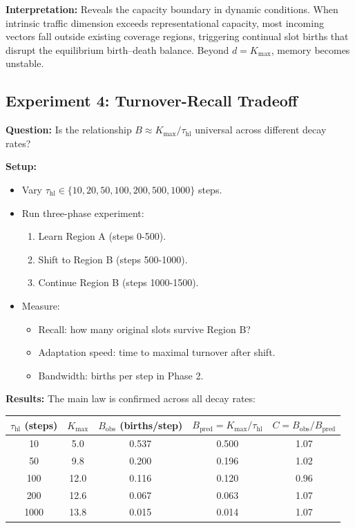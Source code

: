 \documentclass[11pt]{article}
\begin{document}
\textbf{Interpretation:}
Reveals the capacity boundary in dynamic conditions.
When intrinsic traffic dimension exceeds representational capacity, most incoming vectors fall outside existing coverage regions, triggering continual slot births that disrupt the equilibrium birth--death balance.
Beyond $d = K_{\max}$, memory becomes unstable.

\subsection{Experiment 4: Turnover-Recall Tradeoff}

\textbf{Question:} Is the relationship $B \approx K_{\max} / \tau_{\text{hl}}$ universal across different decay rates?

\textbf{Setup:}
\begin{itemize}
  \item Vary $\tau_{\text{hl}} \in \{10, 20, 50, 100, 200, 500, 1000\}$ steps.
  \item Run three-phase experiment:
    \begin{enumerate}
      \item Learn Region A (steps 0-500).
      \item Shift to Region B (steps 500-1000).
      \item Continue Region B (steps 1000-1500).
    \end{enumerate}
  \item Measure:
    \begin{itemize}
      \item Recall: how many original slots survive Region B?
      \item Adaptation speed: time to maximal turnover after shift.
      \item Bandwidth: births per step in Phase 2.
    \end{itemize}
\end{itemize}

\textbf{Results:}
The main law is confirmed across all decay rates:
\begin{center}
\begin{tabular}{ccccc}
\toprule
$\tau_{\text{hl}}$ (steps) & $K_{\max}$ & $B_{\text{obs}}$ (births/step) & $B_{\text{pred}} = K_{\max}/\tau_{\text{hl}}$ & $C = B_{\text{obs}}/B_{\text{pred}}$ \\
\midrule
10   &  5.0 & 0.537 & 0.500 & 1.07 \\
50   &  9.8 & 0.200 & 0.196 & 1.02 \\
100  & 12.0 & 0.116 & 0.120 & 0.96 \\
200  & 12.6 & 0.067 & 0.063 & 1.07 \\
1000 & 13.8 & 0.015 & 0.014 & 1.07 \\
\bottomrule
\end{tabular}
\end{center}
\end{document}
